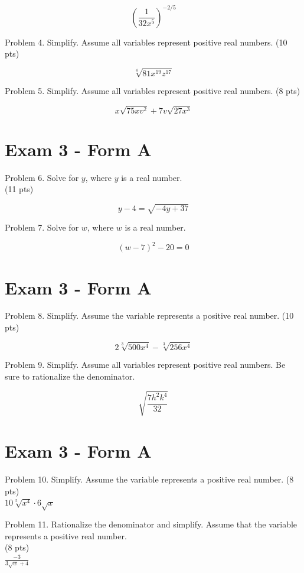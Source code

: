 \documentclass{ximera}
\begin{document}
$$\left(\frac{1}{32 x^{5}}\right)^{-2 / 5}$$

Problem 4. Simplify. Assume all variables represent positive real numbers. (10 pts)

$$\sqrt[4]{81 x^{19} z^{17}}$$

Problem 5. Simplify. Assume all variables represent positive real numbers. (8 pts)

$$x \sqrt{75 x v^{2}}+7 v \sqrt{27 x^{3}}$$

\section*{Exam 3 - Form A}
Problem 6. Solve for $y$, where $y$ is a real number.\\
(11 pts)

$$y-4=\sqrt{-4 y+37}$$

Problem 7. Solve for $w$, where $w$ is a real number.

$$(w-7)^{2}-20=0$$

\section*{Exam 3 - Form A}
Problem 8. Simplify. Assume the variable represents a positive real number. (10 pts)

$$2 \sqrt[3]{500 x^{4}}-\sqrt[3]{256 x^{4}}$$

Problem 9. Simplify. Assume all variables represent positive real numbers. Be sure to rationalize the denominator.

$$\sqrt{\frac{7 h^{2} k^{4}}{32}}$$

\section*{Exam 3 - Form A}
Problem 10. Simplify. Assume the variable represents a positive real number. (8 pts)\\
$10 \sqrt[5]{x^{4}} \cdot 6 \sqrt{x}$

Problem 11. Rationalize the denominator and simplify. Assume that the variable represents a positive real number.\\
(8 pts)\\
$\frac{-3}{3 \sqrt{w}+4}$
\end{document}
